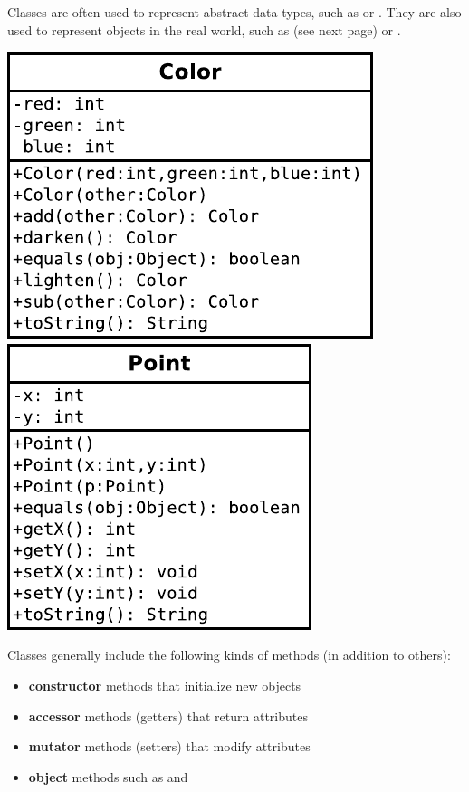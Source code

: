 

Classes are often used to represent abstract data types, such as  or .
They are also used to represent objects in the real world, such as  (see next page) or .

\begin{center}
\includegraphics{Color.pdf}  %
~~~~~
\includegraphics{Point.pdf}  %
\end{center}

Classes generally include the following kinds of methods (in addition to others):
\begin{itemize}[itemsep=0pt]
\item \textbf{constructor} methods that initialize new objects
\item \textbf{accessor} methods (getters) that return attributes
\item \textbf{mutator} methods (setters) that modify attributes
\item \textbf{object} methods such as  and 
\end{itemize}


